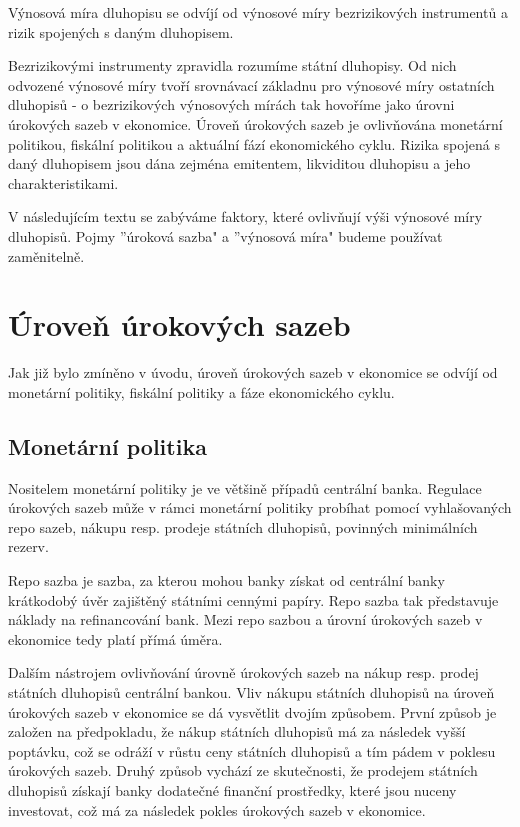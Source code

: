 \documentclass[a4paper]{book}
\begin{document}
Výnosová míra dluhopisu se odvíjí od výnosové míry bezrizikových instrumentů a rizik spojených s daným dluhopisem.

Bezrizikovými instrumenty zpravidla rozumíme státní dluhopisy. Od nich odvozené výnosové míry tvoří srovnávací základnu pro výnosové míry ostatních dluhopisů - o bezrizikových výnosových mírách tak hovoříme jako úrovni úrokových sazeb v ekonomice. Úroveň úrokových sazeb je ovlivňována monetární politikou, fiskální politikou a aktuální fází ekonomického cyklu. Rizika spojená s daný dluhopisem jsou dána zejména emitentem, likviditou dluhopisu a jeho charakteristikami.

V následujícím textu se zabýváme faktory, které ovlivňují výši výnosové míry dluhopisů. Pojmy ''úroková sazba" a ''výnosová míra" budeme používat zaměnitelně.

\section{Úroveň úrokových sazeb}

Jak již bylo zmíněno v úvodu, úroveň úrokových sazeb v ekonomice se odvíjí od monetární politiky, fiskální politiky a fáze ekonomického cyklu.

\subsection{Monetární politika}

Nositelem monetární politiky je ve většině případů centrální banka. Regulace úrokových sazeb může v rámci monetární politiky probíhat pomocí vyhlašovaných repo sazeb, nákupu resp. prodeje státních dluhopisů, povinných minimálních rezerv.

Repo sazba je sazba, za kterou mohou banky získat od centrální banky krátkodobý úvěr zajištěný státními cennými papíry. Repo sazba tak představuje náklady na refinancování bank. Mezi repo sazbou a úrovní úrokových sazeb v ekonomice tedy platí přímá úměra.

Dalším nástrojem ovlivňování úrovně úrokových sazeb na nákup resp. prodej státních dluhopisů centrální bankou. Vliv nákupu státních dluhopisů na úroveň úrokových sazeb v ekonomice se dá vysvětlit dvojím způsobem. První způsob je založen na předpokladu, že nákup státních dluhopisů má za následek vyšší poptávku, což se odráží v růstu ceny státních dluhopisů a tím pádem v poklesu úrokových sazeb. Druhý způsob vychází ze skutečnosti, že prodejem státních dluhopisů získají banky dodatečné finanční prostředky, které jsou nuceny investovat, což má za následek pokles úrokových sazeb v ekonomice.
\end{document}
